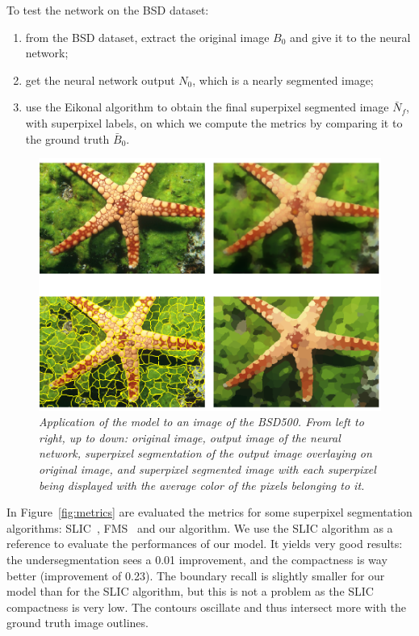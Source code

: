 \documentclass{article}
\begin{document}
        To test the network on the BSD dataset:
        \begin{enumerate}
            \item from the BSD dataset, extract the original image $B_0$ and give it to the neural network;
            \item get the neural network output $N_0$, which is a nearly segmented image;
            \item use the Eikonal algorithm to obtain the final superpixel segmented image $\bar N_f$, with superpixel labels, on which we compute the metrics by comparing it to the ground truth $\bar B_0$.
        \end{enumerate}

        \begin{figure}[!htb]
            \centering
            \includegraphics[width=.8\linewidth]{pics/img_bsd_res2.png}
            \caption{\textit{Application of the model to an image of the BSD500. From left to right, up to down: original image, output image of the neural network, superpixel segmentation of the output image overlaying on original image, and superpixel segmented image with each superpixel being displayed with the average color of the pixels belonging to it.}}
        \end{figure}
        \newpage
        In Figure~\ref{fig:metrics} are evaluated the metrics for some superpixel segmentation algorithms: SLIC~\cite{achanta2012}, FMS~\cite{figliuzzi2019} and our algorithm. We use the SLIC algorithm as a reference to evaluate the performances of our model. It yields very good results: the undersegmentation sees a 0.01 improvement, and the compactness is way better (improvement of 0.23). The boundary recall is slightly smaller for our model than for the SLIC algorithm, but this is not a problem as the SLIC compactness is very low. The contours oscillate and thus intersect more with the ground truth image outlines.
\end{document}
